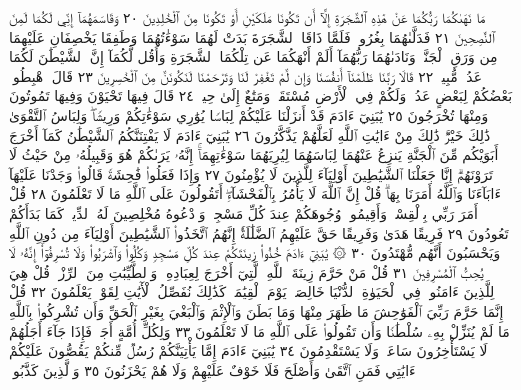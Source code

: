 مَا نَهَىٰكُمَا رَبُّكُمَا عَنْ هَٰذِهِ ٱلشَّجَرَةِ إِلَّآ أَن تَكُونَا مَلَكَيْنِ
أَوْ تَكُونَا مِنَ ٱلْخَٰلِدِينَ ٢٠ وَقَاسَمَهُمَآ إِنِّي لَكُمَا لَمِنَ ٱلنَّٰصِحِينَ ٢١
فَدَلَّىٰهُمَا بِغُرُورࣲۚ فَلَمَّا ذَاقَا ٱلشَّجَرَةَ بَدَتْ لَهُمَا سَوْءَٰتُهُمَا وَطَفِقَا
يَخْصِفَانِ عَلَيْهِمَا مِن وَرَقِ ٱلْجَنَّةِۖ وَنَادَىٰهُمَا رَبُّهُمَآ أَلَمْ أَنْهَكُمَا عَن
تِلْكُمَا ٱلشَّجَرَةِ وَأَقُل لَّكُمَآ إِنَّ ٱلشَّيْطَٰنَ لَكُمَا عَدُوࣱّ مُّبِينࣱ ٢٢
قَالَا رَبَّنَا ظَلَمْنَآ أَنفُسَنَا وَإِن لَّمْ تَغْفِرْ لَنَا وَتَرْحَمْنَا لَنَكُونَنَّ
مِنَ ٱلْخَٰسِرِينَ ٢٣ قَالَ ٱهْبِطُوا۟ بَعْضُكُمْ لِبَعْضٍ عَدُوࣱّۖ وَلَكُمْ
فِي ٱلْأَرْضِ مُسْتَقَرࣱّ وَمَتَٰعٌ إِلَىٰ حِينࣲ ٢٤ قَالَ فِيهَا تَحْيَوْنَ وَفِيهَا
تَمُوتُونَ وَمِنْهَا تُخْرَجُونَ ٢٥ يَٰبَنِيٓ ءَادَمَ قَدْ أَنزَلْنَا عَلَيْكُمْ
لِبَاسࣰا يُوَٰرِي سَوْءَٰتِكُمْ وَرِيشࣰاۖ وَلِبَاسُ ٱلتَّقْوَىٰ ذَٰلِكَ خَيْرࣱۚ
ذَٰلِكَ مِنْ ءَايَٰتِ ٱللَّهِ لَعَلَّهُمْ يَذَّكَّرُونَ ٢٦ يَٰبَنِيٓ ءَادَمَ لَا يَفْتِنَنَّكُمُ
ٱلشَّيْطَٰنُ كَمَآ أَخْرَجَ أَبَوَيْكُم مِّنَ ٱلْجَنَّةِ يَنزِعُ عَنْهُمَا
لِبَاسَهُمَا لِيُرِيَهُمَا سَوْءَٰتِهِمَآۚ إِنَّهُۥ يَرَىٰكُمْ هُوَ وَقَبِيلُهُۥ مِنْ
حَيْثُ لَا تَرَوْنَهُمْۗ إِنَّا جَعَلْنَا ٱلشَّيَٰطِينَ أَوْلِيَآءَ لِلَّذِينَ لَا يُؤْمِنُونَ ٢٧
وَإِذَا فَعَلُوا۟ فَٰحِشَةࣰ قَالُوا۟ وَجَدْنَا عَلَيْهَآ ءَابَآءَنَا وَٱللَّهُ أَمَرَنَا بِهَاۗ
قُلْ إِنَّ ٱللَّهَ لَا يَأْمُرُ بِٱلْفَحْشَآءِۖ أَتَقُولُونَ عَلَى ٱللَّهِ مَا لَا تَعْلَمُونَ ٢٨
قُلْ أَمَرَ رَبِّي بِٱلْقِسْطِۖ وَأَقِيمُوا۟ وُجُوهَكُمْ عِندَ كُلِّ مَسْجِدࣲ
وَٱدْعُوهُ مُخْلِصِينَ لَهُ ٱلدِّينَۚ كَمَا بَدَأَكُمْ تَعُودُونَ ٢٩
فَرِيقًا هَدَىٰ وَفَرِيقًا حَقَّ عَلَيْهِمُ ٱلضَّلَٰلَةُۚ إِنَّهُمُ ٱتَّخَذُوا۟
ٱلشَّيَٰطِينَ أَوْلِيَآءَ مِن دُونِ ٱللَّهِ وَيَحْسَبُونَ أَنَّهُم مُّهْتَدُونَ ٣٠
۞ يَٰبَنِيٓ ءَادَمَ خُذُوا۟ زِينَتَكُمْ عِندَ كُلِّ مَسْجِدࣲ وَكُلُوا۟ وَٱشْرَبُوا۟
وَلَا تُسْرِفُوٓا۟ۚ إِنَّهُۥ لَا يُحِبُّ ٱلْمُسْرِفِينَ ٣١ قُلْ مَنْ حَرَّمَ زِينَةَ ٱللَّهِ
ٱلَّتِيٓ أَخْرَجَ لِعِبَادِهِۦ وَٱلطَّيِّبَٰتِ مِنَ ٱلرِّزْقِۚ قُلْ هِيَ لِلَّذِينَ ءَامَنُوا۟
فِي ٱلْحَيَوٰةِ ٱلدُّنْيَا خَالِصَةࣰ يَوْمَ ٱلْقِيَٰمَةِۗ كَذَٰلِكَ نُفَصِّلُ ٱلْأٓيَٰتِ
لِقَوْمࣲ يَعْلَمُونَ ٣٢ قُلْ إِنَّمَا حَرَّمَ رَبِّيَ ٱلْفَوَٰحِشَ مَا ظَهَرَ مِنْهَا وَمَا
بَطَنَ وَٱلْإِثْمَ وَٱلْبَغْيَ بِغَيْرِ ٱلْحَقِّ وَأَن تُشْرِكُوا۟ بِٱللَّهِ مَا لَمْ يُنَزِّلْ
بِهِۦ سُلْطَٰنࣰا وَأَن تَقُولُوا۟ عَلَى ٱللَّهِ مَا لَا تَعْلَمُونَ ٣٣ وَلِكُلِّ أُمَّةٍ
أَجَلࣱۖ فَإِذَا جَآءَ أَجَلُهُمْ لَا يَسْتَأْخِرُونَ سَاعَةࣰ وَلَا يَسْتَقْدِمُونَ ٣٤
يَٰبَنِيٓ ءَادَمَ إِمَّا يَأْتِيَنَّكُمْ رُسُلࣱ مِّنكُمْ يَقُصُّونَ عَلَيْكُمْ ءَايَٰتِي فَمَنِ
ٱتَّقَىٰ وَأَصْلَحَ فَلَا خَوْفٌ عَلَيْهِمْ وَلَا هُمْ يَحْزَنُونَ ٣٥ وَٱلَّذِينَ كَذَّبُوا۟
